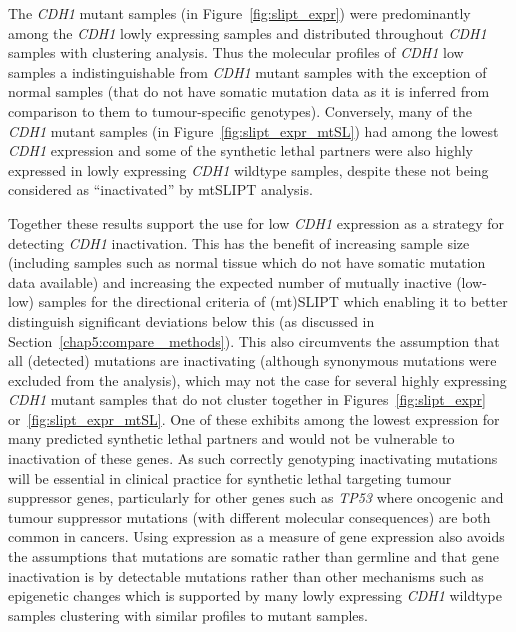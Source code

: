 The \textit{CDH1} mutant samples (in Figure~\ref{fig:slipt_expr}) were predominantly among the \textit{CDH1} lowly expressing samples and distributed throughout \textit{CDH1} samples with clustering analysis. Thus the molecular profiles of \textit{CDH1} low samples a indistinguishable from \textit{CDH1} mutant samples with the exception of normal samples (that do not have somatic mutation data as it is inferred from comparison to them to tumour-specific genotypes). Conversely, many of the \textit{CDH1} mutant samples (in Figure~\ref{fig:slipt_expr_mtSL}) had among the lowest \textit{CDH1} expression and some of the synthetic lethal partners were also highly expressed in lowly expressing \textit{CDH1} wildtype samples, despite these not being considered as ``inactivated'' by mtSLIPT analysis.

Together these results support the use for low \textit{CDH1} expression as a strategy for detecting \textit{CDH1} inactivation. This has the benefit of increasing sample size (including samples such as normal tissue which do not have somatic mutation data available) and increasing the expected number of mutually inactive (low-low) samples for the directional criteria of (mt)SLIPT which enabling it to better distinguish significant deviations below this (as discussed in Section~\ref{chap5:compare_ methods}). This also circumvents the assumption that all (detected) mutations are inactivating (although synonymous mutations were excluded from the analysis), which may not the case for several highly expressing \textit{CDH1} mutant samples that do not cluster together in Figures~\ref{fig:slipt_expr} or~\ref{fig:slipt_expr_mtSL}. One of these exhibits among the lowest expression for many predicted synthetic lethal partners and would not be vulnerable to inactivation of these genes. As such correctly genotyping inactivating mutations will be essential in clinical practice for synthetic lethal targeting tumour suppressor genes, particularly for other genes such as \textit{TP53} where oncogenic and tumour suppressor mutations (with different molecular consequences) are both common in cancers. Using expression as a measure of gene expression also avoids the assumptions that mutations are somatic rather than germline and that gene inactivation is by detectable mutations rather than other mechanisms such as epigenetic changes which is supported by many lowly expressing \textit{CDH1} wildtype samples clustering with similar profiles to mutant samples.



